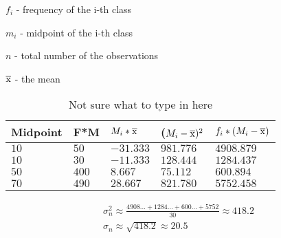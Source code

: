 \documentclass{article}
\begin{document}
$f_i$ - frequency of the i-th class

$m_i$ - midpoint of the i-th class

$n$ - total number of the observations

$\overline{\rm x}$ - the mean

\begin{table}[htbp]
\centering
\begin{tabular}{|l|l|l|l|l|}
\hline
\textbf{Midpoint} & \textbf{F*M} & \textbf{$M_i * \overline{\rm x}$} & \textbf{($M_i - \overline{\rm x})^2$} & \textbf{$f_i * (M_i - \overline{\rm x})$} \\
\hline
$10$ & $50$ & $-31.333$ & $981.776$ & $4908.879$ \\
\hline
$10$ & $30$ & $-11.333$ & $128.444$ & $1284.437$ \\
\hline
$50$ & $400$ & $8.667$ & $75.112$ & $600.894$ \\
\hline
$70$ & $490$ & $28.667$ & $821.780$ & $5752.458$  \\
\hline
\end{tabular}
\caption{Not sure what to type in here}
\label{tab:estimating_a_mean_and_variance_3}
\end{table}
\begin{equation}
  \begin{gathered}
    \sigma^2_n \approx \frac{4908... + 1284... + 600... + 5752}{30} \approx 418.2  \\
    \sigma_n \approx \sqrt{418.2} \approx 20.5
  \end{gathered}
\end{equation}
\end{document}

